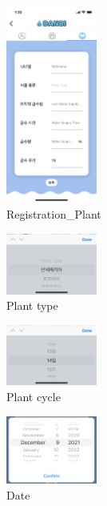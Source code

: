 \documentclass[conference]{IEEEtran}
\begin{document}
\begin{itemize}
\begin{enumerate}
\par \begin{figure}[h!]
\includegraphics[width=3cm]{page/regiPlant.png}
\centering
\caption{Registration\_Plant}
\label{fig:regiPlant}
\end{figure}

\par \begin{figure}[h!]
\includegraphics[width=3cm]{image/Plant type.jpg}
\centering
\caption{Plant type}
\label{fig:type}
\end{figure}

\par \begin{figure}[h!]
\includegraphics[width=3cm]{image/plant cycle.jpg}
\centering
\caption{Plant cycle}
\label{fig:plant cycle}
\end{figure}

\par \begin{figure}[h!]
\includegraphics[width=3cm]{image/date.jpg}
\centering
\caption{Date}
\label{fig:date}
\end{figure}


\end{enumerate}
\end{itemize}
\end{document}

